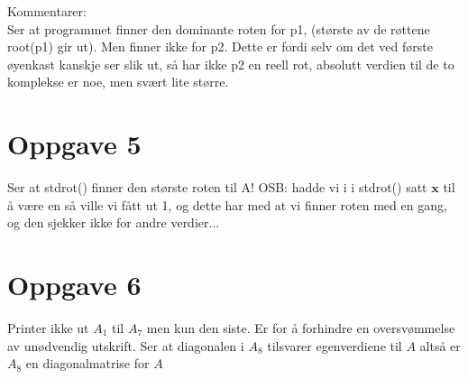 \documentclass[a4paper, norsk, twoside, 10pt]{article}
\begin{document}
\begin{flushleft}
  Kommentarer: \\
  Ser at programmet finner den dominante roten for p1, (største av de røttene root(p1) gir ut). Men finner ikke for p2. Dette er fordi selv om det ved første øyenkast kanskje ser slik ut, så har ikke p2 en reell rot, absolutt verdien til de to komplekse er noe, men svært lite større.


  \section*{Oppgave 5}
  


  Ser at stdrot() finner den største roten til A! OSB: hadde vi i i stdrot() satt $\mathbf{x}$ til å være en så ville vi fått ut 1, og dette har med at vi finner roten med en gang, og den sjekker ikke for andre verdier...

\newpage
  \section*{Oppgave 6}
  
  Printer ikke ut $A_{1}$ til $A_{7}$ men kun den siste. Er for å forhindre en oversvømmelse av unødvendig utskrift.
  Ser at diagonalen i $A_{8}$ tilsvarer egenverdiene til $A$ altså er $A_{8}$ en diagonalmatrise for $A$
\end{flushleft}
\end{document}
